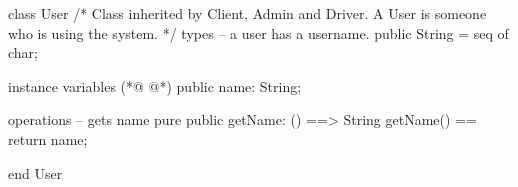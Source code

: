 \begin{vdmpp}[breaklines=true]
class User
/*
    Class inherited by Client, Admin and Driver. A User is someone who is using the system.
*/
types
    -- a user has a username.
    public String = seq of char;

instance variables
(*@
\label{getName:10}
@*)
    public name: String;

operations
 -- gets name
 pure public getName: () ==> String
  getName() == return name;

end User
\end{vdmpp}
